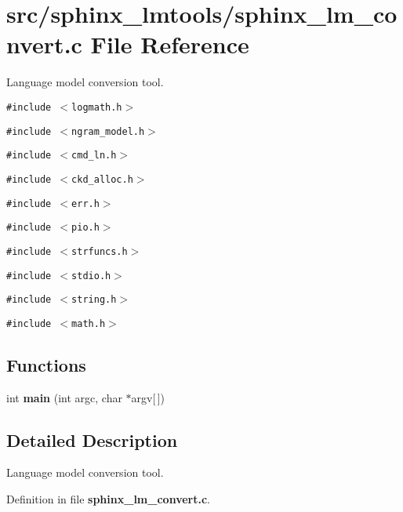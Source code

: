 \section{src/sphinx\_\-lmtools/sphinx\_\-lm\_\-convert.c File Reference}
\label{sphinx__lm__convert_8c}
Language model conversion tool.  


{\tt \#include $<$logmath.h$>$}\par
{\tt \#include $<$ngram\_\-model.h$>$}\par
{\tt \#include $<$cmd\_\-ln.h$>$}\par
{\tt \#include $<$ckd\_\-alloc.h$>$}\par
{\tt \#include $<$err.h$>$}\par
{\tt \#include $<$pio.h$>$}\par
{\tt \#include $<$strfuncs.h$>$}\par
{\tt \#include $<$stdio.h$>$}\par
{\tt \#include $<$string.h$>$}\par
{\tt \#include $<$math.h$>$}\par
\subsection*{Functions}
\begin{CompactItemize}
\item 
int \textbf{main} (int argc, char $\ast$argv[$\,$])\label{sphinx__lm__convert_8c_0ddf1224851353fc92bfbff6f499fa97}

\end{CompactItemize}


\subsection{Detailed Description}
Language model conversion tool. 



Definition in file {\bf sphinx\_\-lm\_\-convert.c}.
